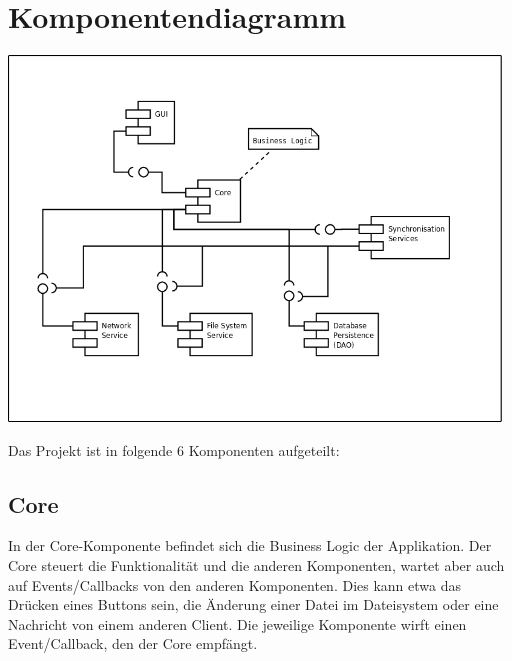 \section{Komponentendiagramm}

\includegraphics[width=0.98\textwidth]{../uml/component_diagram.png}

Das Projekt ist in folgende 6 Komponenten aufgeteilt:




\subsection{Core}
In der Core-Komponente befindet sich die Business Logic der Applikation. Der Core steuert die Funktionalität und die anderen Komponenten, wartet aber auch auf Events/Callbacks von den anderen Komponenten. 
Dies kann etwa das Drücken eines Buttons sein, die Änderung einer Datei im Dateisystem oder eine Nachricht von einem anderen Client. Die jeweilige Komponente wirft einen Event/Callback, den der Core empfängt.

